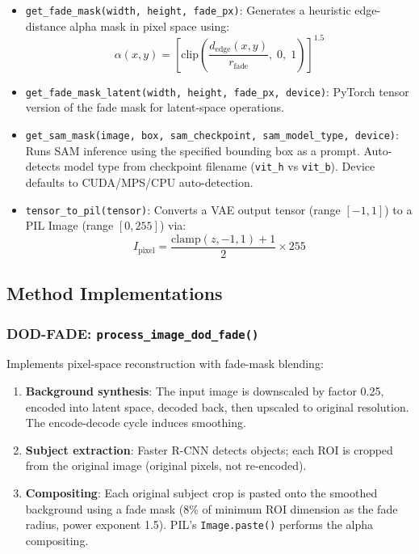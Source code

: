 \documentclass[11pt,a4paper]{article}
\begin{document}
\begin{itemize}
  \item \texttt{get\_fade\_mask(width, height, fade\_px)}: Generates a heuristic edge-distance alpha mask in pixel space using:
  \begin{equation}
    \alpha(x,y) = \left[\text{clip}\left(\frac{d_{\text{edge}}(x,y)}{r_{\text{fade}}},\; 0,\; 1\right)\right]^{1.5}
  \end{equation}

  \item \texttt{get\_fade\_mask\_latent(width, height, fade\_px, device)}: PyTorch tensor version of the fade mask for latent-space operations.

  \item \texttt{get\_sam\_mask(image, box, sam\_checkpoint, sam\_model\_type, device)}: Runs SAM inference using the specified bounding box as a prompt. Auto-detects model type from checkpoint filename (\texttt{vit\_h} vs \texttt{vit\_b}). Device defaults to CUDA/MPS/CPU auto-detection.

  \item \texttt{tensor\_to\_pil(tensor)}: Converts a VAE output tensor (range $[-1, 1]$) to a PIL Image (range $[0, 255]$) via:
  \begin{equation}
    I_{\text{pixel}} = \frac{\text{clamp}(z, -1, 1) + 1}{2} \times 255
  \end{equation}
\end{itemize}

\subsection{Method Implementations}

\subsubsection{DOD-FADE: \texttt{process\_image\_dod\_fade()}}

Implements pixel-space reconstruction with fade-mask blending:

\begin{enumerate}
  \item \textbf{Background synthesis}: The input image is downscaled by factor 0.25, encoded into latent space, decoded back, then upscaled to original resolution. The encode-decode cycle induces smoothing.
  \item \textbf{Subject extraction}: Faster R-CNN detects objects; each ROI is cropped from the original image (original pixels, not re-encoded).
  \item \textbf{Compositing}: Each original subject crop is pasted onto the smoothed background using a fade mask (8\% of minimum ROI dimension as the fade radius, power exponent 1.5). PIL's \texttt{Image.paste()} performs the alpha compositing.
\end{enumerate}
\end{document}
